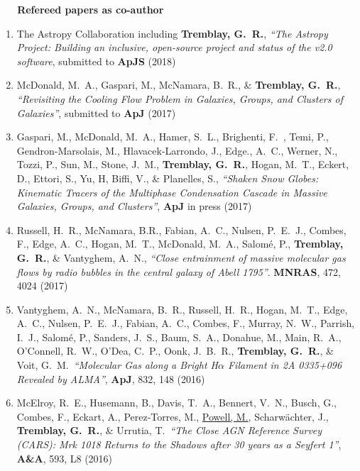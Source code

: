 \documentclass[11pt]{article}
\begin{document}
\vspace{4mm}

\noindent \textbf{~~~Refereed papers as co-author}

\begin{enumerate}[resume]

\item The Astropy Collaboration including \textbf{Tremblay, G.~R.}, \textit{``The Astropy Project: Building an inclusive,
open-source project and status of the v2.0 software}, submitted to \textbf{ApJS} (2018)

\item McDonald, M.~A., Gaspari, M., McNamara, B.~R., \& \textbf{Tremblay, G.~R.}, \textit{``Revisiting the Cooling Flow Problem in Galaxies, Groups, and Clusters of Galaxies''}, submitted to \textbf{ApJ} (2017)

\item Gaspari, M., McDonald, M.~A.,
Hamer, S.~L., Brighenti, F.~, Temi, P., Gendron-Marsolais, M., Hlavacek-Larrondo, J., Edge., A.~C.,
Werner, N., Tozzi, P., Sun, M.,
Stone, J.~M., \textbf{Tremblay, G.~R.}, Hogan, M.~T., Eckert, D.,
Ettori, S., Yu, H, Biffi, V.,
\& Planelles, S., \textit{``Shaken Snow Globes: Kinematic Tracers of the Multiphase Condensation
 Cascade in Massive Galaxies, Groups, and Clusters''}, \textbf{ApJ} in press (2017)

\item Russell, H.~R., McNamara, B.R., Fabian, A.~C., Nulsen, P.~E.~J., Combes, F., Edge, A.~C., Hogan, M.~T., McDonald, M.~A., Salom\'{e}, P.,
\textbf{Tremblay, G.~R.}, \& Vantyghem, A.~N., \textit{``Close entrainment of massive molecular gas flows by radio bubbles in the central galaxy of Abell 1795''}. \textbf{MNRAS}, 472, 4024 (2017)


\item Vantyghem, A.~N., McNamara, B.~R.,
Russell, H.~R., Hogan, M.~T., Edge, A.~C.,
Nulsen, P.~E.~J., Fabian, A.~C., Combes, F.,
Murray, N.~W., Parrish, I.~J., Salom\'{e}, P.,
Sanders, J.~S., Baum, S.~A., Donahue, M.,
Main, R.~A., O'Connell, R.~W., O'Dea, C.~P.,
Oonk, J.~B.~R., \textbf{Tremblay, G.~R.}, \& Voit, G.~M.\ \textit{``Molecular Gas along a Bright H$\alpha$ Filament in 2A 0335+096 Revealed by ALMA''}, \textbf{ApJ}, 832, 148 (2016)

\item McElroy, R.~E., Husemann, B.,
Davis, T.~A., Bennert, V.~N., Busch, G.,
Combes, F., Eckart, A., Perez-Torres,
M., \uline{Powell, M.}, Scharw\"{a}chter, J., \textbf{Tremblay, G.~R.}, \& Urrutia, T.\ \textit{``The Close AGN Reference Survey (CARS): Mrk 1018 Returns to the Shadows after 30 years as a Seyfert 1''}, \textbf{A\&A}, 593, L8 (2016)



\end{enumerate}
\end{document}
